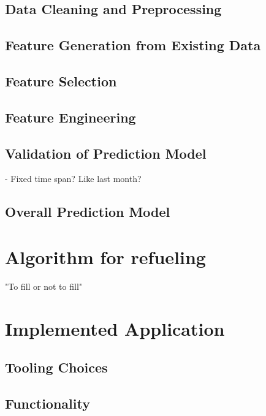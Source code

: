 \documentclass[%
a4paper,
DIV12,
2.5headlines,
bigheadings,
titlepage,
openbib,
]{scrartcl}
\begin{document}
\subsection{Data Cleaning and
Preprocessing}\label{data-cleaning-and-preprocessing}


\subsection{Feature Generation from Existing
Data}\label{feature-generation-from-existing-data}


\subsection{Feature Selection}\label{feature-selection}



\subsection{Feature Engineering}\label{feature-engineering}



\subsection{Validation of Prediction
Model}\label{validation-of-prediction-model}
- Fixed time span? Like last month?


\subsection{Overall Prediction Model}\label{overall-prediction-model}

\section{Algorithm for refueling}
"To fill or not to fill"\cite{khuller2007fill}

\section{Implemented Application}\label{implemented-application}
\subsection{Tooling Choices}\label{tooling-choices}



\subsection{Functionality}\label{functionality}
\end{document}
